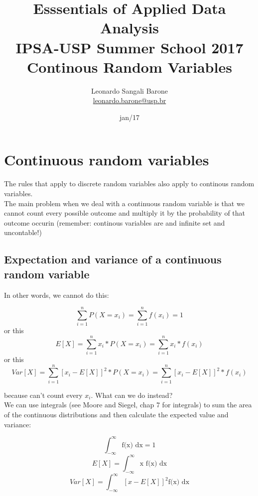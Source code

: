 \documentclass[11pt]{article}
\title{\textbf{Esssentials of Applied Data Analysis\\
				IPSA-USP Summer School 2017}\newline\\
				Continous Random Variables}
\author{Leonardo Sangali Barone\\ \href{leonardo.barone@usp.br}{leonardo.barone@usp.br}}
\date{jan/17}
\begin{document}
\maketitle

\section*{Continuous random variables}
	
	The rules that apply to discrete random variables also apply to continous random variables.\\
	
	The main problem when we deal with a continuous random variable is that we cannot count every possible outcome and multiply it by the probability of that outcome occurin (remember: continous variables are and infinite set and uncontable!)\\

	\subsection*{Expectation and variance of a continuous random variable}

	In other words, we cannot do this:
	
	\[\sum\limits_{i=1}^n P(X = x_i) = \sum\limits_{i=1}^n f(x_i) = 1\]
or this
		\[E[X] = \sum\limits_{i=1}^n x_i* P(X=x_i) =\sum\limits_{i=1}^n x_i * f(x_i)\]
or this
		\[Var[X] = \sum\limits_{i=1}^n[x_i - E[X]]^2 * P(X=x_i) =\sum\limits_{i=1}^n[x_i - E[X]]^2 * f(x_i)\]
		
		because can't count every $x_i$. What can we do instead?\\

	We can use integrals (see Moore and Siegel, chap 7 for integrals) to sum the area of the continuous distributions and then calculate the expected value and variance:
	
	\[\int_{-\infty}^{\infty} \text{f(x) dx} = 1\]
	\[E[X] = \int_{-\infty}^{\infty}  \text{x f(x) dx}\]
	\[Var[X] = \int_{-\infty}^{\infty}  [x - E[X]]^2 \text{f(x) dx}\]
\end{document}
